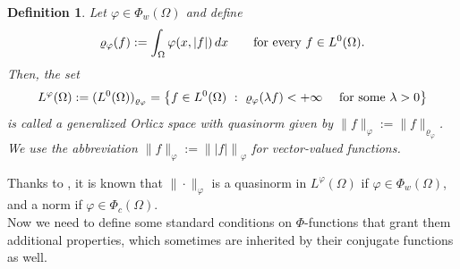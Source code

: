\documentclass[a4paper,11pt,oneside,notitlepage]{article}
\newtheorem{definition}[theorem]{Definition}
\numberwithin{equation}{section}
\newcommand{\vphi}{\varphi}
\newcommand{\vrho}{\varrho}
\newcommand{\st}{ \ : \ }
\begin{document}
\begin{definition}
    Let $\vphi \in \Phi_w(\Omega)$ and define
    \begin{equation*}
        \vrho_\vphi(f) := \int_\Omega \vphi (x,|f|) \, dx \qquad \textnormal{for every } f \in L^0(\Omega).
    \end{equation*}
    Then, the set
    \begin{equation*}
    L^\vphi(\Omega) := (L^0(\Omega))_{\vrho_\vphi} = \left\{ f \in L^0(\Omega) \st \vrho_\vphi(\lambda  f) < +\infty \quad \textnormal{ for some } \lambda > 0 \right\}
    \end{equation*}
    is called a \textit{generalized Orlicz space} with quasinorm given by $\|f\|_\vphi := \|f\|_{\vrho_\vphi}$. We use the abbreviation $\|f\|_\vphi := \left\| |f| \right\|_\vphi$ for vector-valued functions.
\end{definition}

Thanks to \cite[Lemma 3.2.2]{HaH}, it is known that $\|\cdot\|_\vphi$ is a quasinorm in $L^\vphi(\Omega)$ if $\vphi \in \Phi_w(\Omega)$, and a norm if $\vphi \in \Phi_c(\Omega)$.
\\
Now we need to define some standard conditions on $\Phi$-functions that grant them additional properties, which sometimes are inherited by their conjugate functions as well.
\end{document}
